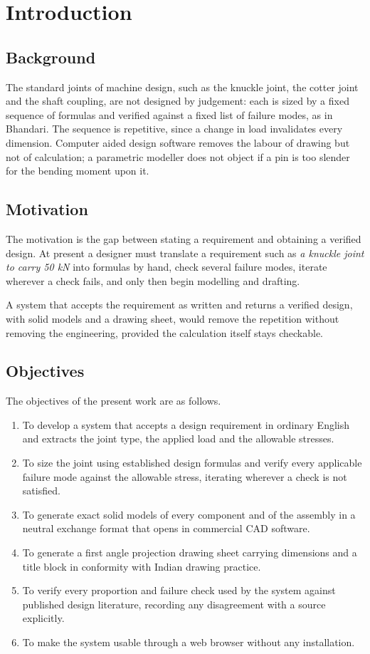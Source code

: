 \chapter{Introduction}

\section{Background}
The standard joints of machine design, such as the knuckle joint, the cotter joint and the shaft coupling, are not designed by judgement: each is sized by a fixed sequence of formulas and verified against a fixed list of failure modes, as in Bhandari. The sequence is repetitive, since a change in load invalidates every dimension. Computer aided design software removes the labour of drawing but not of calculation; a parametric modeller does not object if a pin is too slender for the bending moment upon it.

\section{Motivation}
The motivation is the gap between stating a requirement and obtaining a verified design. At present a designer must translate a requirement such as \emph{a knuckle joint to carry 50 kN} into formulas by hand, check several failure modes, iterate wherever a check fails, and only then begin modelling and drafting.

A system that accepts the requirement as written and returns a verified design, with solid models and a drawing sheet, would remove the repetition without removing the engineering, provided the calculation itself stays checkable.

\section{Objectives}
The objectives of the present work are as follows.
\begin{enumerate}
  \item To develop a system that accepts a design requirement in ordinary English and extracts the joint type, the applied load and the allowable stresses.
  \item To size the joint using established design formulas and verify every applicable failure mode against the allowable stress, iterating wherever a check is not satisfied.
  \item To generate exact solid models of every component and of the assembly in a neutral exchange format that opens in commercial CAD software.
  \item To generate a first angle projection drawing sheet carrying dimensions and a title block in conformity with Indian drawing practice.
  \item To verify every proportion and failure check used by the system against published design literature, recording any disagreement with a source explicitly.
  \item To make the system usable through a web browser without any installation.
\end{enumerate}

